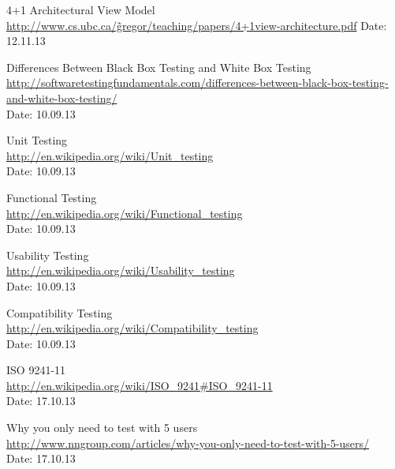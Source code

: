 \begin{thebibliography}{99}
	4+1 Architectural View Model
	\href{http://www.cs.ubc.ca/~gregor/teaching/papers/4+1view-architecture.pdf}{http://www.cs.ubc.ca/\~gregor/teaching/papers/4+1view-architecture.pdf}
	Date: 12.11.13


	Differences Between Black Box Testing and White Box Testing \\
	\href {http://softwaretestingfundamentals.com/differences-between-black-box-testing-and-white-box-testing/}{http://softwaretestingfundamentals.com/differences-between-black-box-testing-and-white-box-testing/} \\
	Date: 10.09.13

	Unit Testing \\
	\href {http://en.wikipedia.org/wiki/Unit_testing}{http://en.wikipedia.org/wiki/Unit\_testing} \\
	Date: 10.09.13

	Functional Testing \\
	\href {http://en.wikipedia.org/wiki/Functional_testing}{http://en.wikipedia.org/wiki/Functional\_testing} \\
	Date: 10.09.13

	Usability Testing \\
	\href {http://en.wikipedia.org/wiki/Usability_testing}{http://en.wikipedia.org/wiki/Usability\_testing} \\
	Date: 10.09.13

	Compatibility Testing \\
	\href {http://en.wikipedia.org/wiki/Compatibility_testing}{http://en.wikipedia.org/wiki/Compatibility\_testing} \\
	Date: 10.09.13

	ISO 9241-11 \\
	\href {http://en.wikipedia.org/wiki/ISO_9241#ISO_9241-11}{http://en.wikipedia.org/wiki/ISO\_9241\#ISO\_9241-11} \\
	Date: 17.10.13

	Why you only need to test with 5 users \\
	\href {http://www.nngroup.com/articles/why-you-only-need-to-test-with-5-users/}{http://www.nngroup.com/articles/why-you-only-need-to-test-with-5-users/} \\
	Date: 17.10.13


\end{thebibliography}
